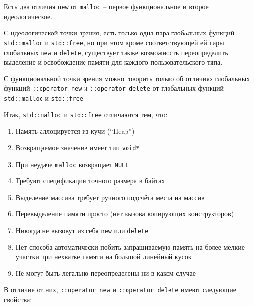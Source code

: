 \documentclass[a4paper,12pt,oneside]{article}
\begin{document}
Есть два отличия \lstinline!new! от \lstinline!malloc! -- первое функциональное и второе идеологическое. 

С идеологической точки зрения, есть только одна пара глобaльных функций \lstinline!std::malloc! и \lstinline!std::free!, но при этом кроме соответствующей ей пары глобальных \lstinline!new! и \lstinline!delete!, существует также возможность переопределить выделение и освобождение памяти для каждого пользовательского типа.

С функциональной точки зрения можно говорить только об отличиях глобальных функций \lstinline!::operator new! и \lstinline!::operator delete! от глобальных функций \lstinline!std::malloc! и \lstinline!std::free!

Итак, \lstinline!std::malloc! и \lstinline!std::free! отличаются тем, что:

\begin{enumerate}
\item
Память аллоцируется из кучи (``Heap'')
\item
Возвращаемое значение имеет тип \lstinline!void*!
\item
При неудаче \lstinline!malloc! возвращает \lstinline!NULL!
\item
Требуют спецификации точного размера в байтах
\item
Выделение массива требует ручного подсчёта места на массив
\item
Перевыделение памяти просто (нет вызова копирующих конструкторов)
\item
Никогда не вызовут из себя \lstinline!new! или \lstinline!delete!
\item
Нет способа автоматически побить запрашиваемую память на более мелкие участки при нехватке памяти на большой линейный кусок
\item
Не могут быть легально переопределены ни в каком случае
\end{enumerate}

В отличие от них, \lstinline!::operator new! и \lstinline!::operator delete! имеют следующие свойства:
\end{document}
